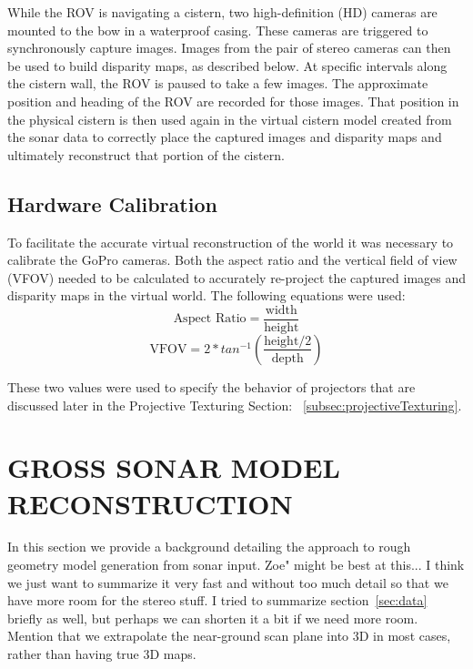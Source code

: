 \documentclass[a4paper,twoside]{article}
\begin{document}
While the ROV is navigating a cistern, two high-definition (HD) cameras are mounted to the bow in a waterproof casing.
These cameras are triggered to synchronously capture images.  
Images from the pair of stereo cameras can then be used to build disparity maps, as described below.  
At specific intervals along the cistern wall, the ROV is paused to take a few images.  
The approximate position and heading of the ROV are recorded for those images.  
That position in the physical cistern is then used again in the virtual cistern model created from the sonar data to correctly place the captured images and disparity maps and ultimately reconstruct that portion of the cistern. 

\subsection{Hardware Calibration}
To facilitate the accurate virtual reconstruction of the world it was necessary to calibrate the GoPro cameras.
  Both the aspect ratio and the vertical field of view (VFOV) needed to be calculated to accurately re-project the captured images and disparity maps in the virtual world.  
The following equations were used:
\[ \text{Aspect Ratio} = \frac{\text{width}}{\text{height}}\]
\[ \text{VFOV} = 2 * tan^{-1}(\frac{\text{height}/2}{\text{depth}}) \]


These two values were used to specify the behavior of projectors that are discussed later in the Projective Texturing Section: ~\ref{subsec:projectiveTexturing}.

\section{\uppercase{Gross sonar Model Reconstruction}}
\label{sec:reconstruction}




\noindent In this section we provide a background detailing the approach to rough geometry model generation from sonar input. Zoe" might be best at this... I think we just want to summarize it very fast and without too much detail so that we have more room for the stereo stuff. I tried to summarize section~\ref{sec:data} briefly as well, but perhaps we can shorten it a bit if we need more room. Mention that we extrapolate the near-ground scan plane into 3D in most cases, rather than having true 3D maps.
\end{document}
